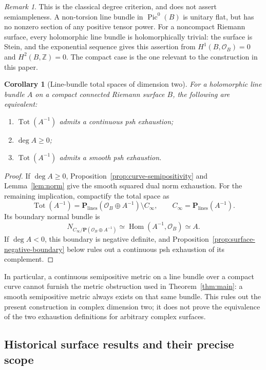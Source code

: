 \documentclass[11pt]{amsart}
\newtheorem{corollary}[theorem]{Corollary}
\theoremstyle{definition}
\theoremstyle{remark}
\newtheorem{remark}[theorem]{Remark}
\numberwithin{equation}{section}
\newcommand{\PP}{\mathbf P}
\newcommand{\OO}{\mathcal O}
\newcommand{\Tot}{\operatorname{Tot}}
\begin{document}
\begin{remark}
This is the classical degree criterion, and does not assert
semiampleness.  A non-torsion line bundle in $\operatorname{Pic}^0(B)$
is unitary flat, but has no nonzero section of any positive tensor
power.  For a noncompact Riemann surface, every holomorphic line bundle
is holomorphically trivial: the surface is Stein, and the exponential
sequence gives this assertion from $H^1(B,\OO_B)=0$ and
$H^2(B,\mathbb Z)=0$.  The compact case is the one relevant to the
construction in this paper.
\end{remark}

\begin{corollary}[Line-bundle total spaces of dimension two]
\label{cor:curve-total-space}
For a holomorphic line bundle $A$ on a compact connected Riemann surface
$B$, the following are equivalent:
\begin{enumerate}[label=\textup{(\roman*)},leftmargin=2.5em]
\item $\Tot(A^{-1})$ admits a continuous psh exhaustion;
\item $\deg A\ge0$;
\item $\Tot(A^{-1})$ admits a smooth psh exhaustion.
\end{enumerate}
\end{corollary}

\begin{proof}
If $\deg A\ge0$, Proposition~\ref{prop:curve-semipositivity} and
Lemma~\ref{lem:norm} give the smooth squared dual norm exhaustion.
For the remaining implication, compactify the total space as
\[
\Tot(A^{-1})=
\PP_{\mathrm{lines}}(\OO_B\oplus A^{-1})\setminus C_\infty,
\qquad C_\infty=\PP_{\mathrm{lines}}(A^{-1}).
\]
Its boundary normal bundle is
\[
N_{C_\infty/\PP(\OO_B\oplus A^{-1})}
\simeq\operatorname{Hom}(A^{-1},\OO_B)\simeq A.
\]
If $\deg A<0$, this boundary is negative definite, and
Proposition~\ref{prop:surface-negative-boundary} below rules out a
continuous psh exhaustion of its complement.
\end{proof}

In particular, a continuous semipositive metric on a line bundle over
a compact curve cannot furnish the metric obstruction used in
Theorem~\ref{thm:main}: a smooth semipositive metric always exists on
that same bundle.  This rules out the present construction in complex
dimension two; it does not prove the equivalence of the two exhaustion
definitions for arbitrary complex surfaces.

\subsection{Historical surface results and their precise scope}
\label{subsec:surface-history}
\end{document}
